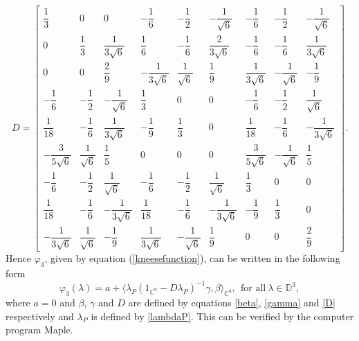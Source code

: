 \documentclass[11pt, reqno]{amsart}
\newcommand\1{\boldsymbol {1}}
\numberwithin{equation}{section}
\begin{document}
\begin{equation}\label{D}
D = \begin{bmatrix}
\dfrac{1}{3} & 0 & 0 &-\dfrac{1}{6} & -\dfrac{1}{2} & -\dfrac{1}{\sqrt{6}} & -\dfrac{1}{6} & -\dfrac{1}{2} & -\dfrac{1}{\sqrt{6}} \\[0.5cm]
0 & \dfrac{1}{3} & \dfrac{1}{3\sqrt{6}} & \dfrac{1}{6} & -\dfrac{1}{6} & \dfrac{2}{3\sqrt{6}} & -\dfrac{1}{6} & -\dfrac{1}{6} & \dfrac{1}{3\sqrt{6}}\\[0.5cm]
0 & 0 & \dfrac{2}{9} & -\dfrac{1}{3\sqrt{6}} & \dfrac{1}{\sqrt{6}} & \dfrac{1}{9} & \dfrac{1}{3\sqrt{6}} & -\dfrac{1}{\sqrt{6}} & -\dfrac{1}{9} \\[0.5cm]
-\dfrac{1}{6} & -\dfrac{1}{2} & -\dfrac{1}{\sqrt{6}} & \dfrac{1}{3} & 0 & 0 & -\dfrac{1}{6} & -\dfrac{1}{2} & \dfrac{1}{\sqrt{6}} \\[0.5cm]
\dfrac{1}{18} & -\dfrac{1}{6} & \dfrac{1}{3\sqrt{6}} & -\dfrac{1}{9} & \dfrac{1}{3} & 0 & \dfrac{1}{18} & -\dfrac{1}{6} & -\dfrac{1}{3\sqrt{6}} \\[0.5cm]
-\dfrac{3}{5\sqrt{6}} & \dfrac{1}{\sqrt{6}} & \dfrac{1}{5} & 0 & 0 & 0 & \dfrac{3}{5\sqrt{6}} & -\dfrac{1}{\sqrt{6}} & \dfrac{1}{5} \\[0.5cm]
-\dfrac{1}{6} & -\dfrac{1}{2} & \dfrac{1}{\sqrt{6}} & -\dfrac{1}{6} & -\dfrac{1}{2} & \dfrac{1}{\sqrt{6}} & \dfrac{1}{3} & 0 & 0\\[0.5cm]
\dfrac{1}{18} & -\dfrac{1}{6} & -\dfrac{1}{3\sqrt{6}} & \dfrac{1}{18} & -\dfrac{1}{6} & -\dfrac{1}{3\sqrt{6}} & -\dfrac{1}{9} & \dfrac{1}{3} & 0 \\[0.5cm]
-\dfrac{1}{3\sqrt{6}} & \dfrac{1}{\sqrt{6}} & -\dfrac{1}{9} & \dfrac{1}{3\sqrt{6}} & -\dfrac{1}{\sqrt{6}} & \dfrac{1}{9} & 0 & 0 & \dfrac{2}{9} 
\end{bmatrix}.
\end{equation} 
Hence $\varphi_3$, given by equation (\ref{kneesefunction}), can be written in the following form
$$\varphi_3(\lambda) = a + \langle \lambda_{P}(1_{\mathbb{C}^{9}}-D\lambda_{P})^{-1}\gamma,\beta \rangle_{\mathbb{C}^{9}},~~\text{for all}~\lambda\in\mathbb{D}^{3},$$
where $a=0$ and   $\beta$, $\gamma$ and $D$ are defined by equations  \eqref{beta}, \eqref{gamma} and \eqref{D} respectively and $\lambda_{P}$ is defined by \eqref{lambdaP}.
This can be verified by the computer program Maple.  
\end{document}
